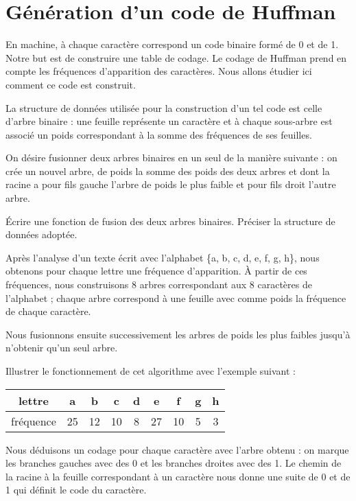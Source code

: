 \renewcommand{\SourceFile}{4-arborescences/src/4-4.ml}

\section{Génération d'un code de Huffman}

En machine, à chaque caractère correspond un code binaire formé de 0 et de 1. Notre but est de construire une table de codage. Le codage de Huffman prend en compte les fréquences d'apparition des caractères. Nous allons étudier ici comment ce code est construit.
\medskip

La structure de données utilisée pour la construction d'un tel code est celle d'arbre binaire : une feuille représente un caractère et à chaque sous-arbre est associé un poids correspondant à la somme des fréquences de ses feuilles.

\Q
On désire fusionner deux arbres binaires en un seul de la manière suivante : on crée un nouvel arbre, de poids la somme des poids des deux arbres et dont la racine a pour fils gauche l'arbre de poids le plus faible et pour fils droit l'autre arbre.
\medskip

Écrire une fonction de fusion des deux arbres binaires. Préciser la structure de données adoptée.

\Q
Après l'analyse d'un texte écrit avec l'alphabet \{a, b, c, d, e, f, g, h\}, nous obtenons pour chaque lettre une fréquence d'apparition. À partir de ces fréquences, nous construisons 8 arbres correspondant aux 8 caractères de l'alphabet ; chaque arbre correspond à une feuille avec comme poids la fréquence de chaque caractère.
\medskip

Nous fusionnons ensuite successivement les arbres de poids les plus faibles jusqu'à n'obtenir qu'un seul arbre.
\medskip

Illustrer le fonctionnement de cet algorithme avec l'exemple suivant :
\smallskip

\begin{tabular}{| c | c | c | c | c | c | c | c | c |}
    \hline
    lettre & a & b & c & d & e & f & g & h\\
    \hline
    fréquence & 25 & 12 & 10 & 8 & 27 & 10 & 5 & 3\\
    \hline
\end{tabular}
\smallskip

\Q
Nous déduisons un codage pour chaque caractère avec l'arbre obtenu : on marque les branches gauches avec des 0 et les branches droites avec des 1. Le chemin de la racine à la feuille correspondant à un caractère nous donne une suite de 0 et de 1 qui définit le code du caractère.
\medskip

